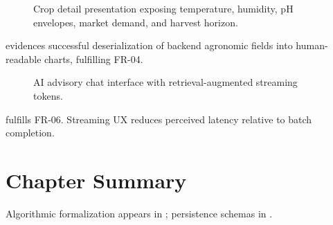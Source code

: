 \begin{figure}[htbp]
\centering
{}
\caption{Crop detail presentation exposing temperature, humidity, pH envelopes, market demand, and harvest horizon.}
\label{fig:ui_crop_detail}
\end{figure}
\noindent{} evidences successful deserialization of backend agronomic fields into human-readable charts, fulfilling FR-04.

\begin{figure}[htbp]
\centering
{}
\caption{AI advisory chat interface with retrieval-augmented streaming tokens.}
\label{fig:ui_chat}
\end{figure}
\noindent{} fulfills FR-06. Streaming UX reduces perceived latency relative to batch completion.

\section{Chapter Summary}
Algorithmic formalization appears in ; persistence schemas in .
